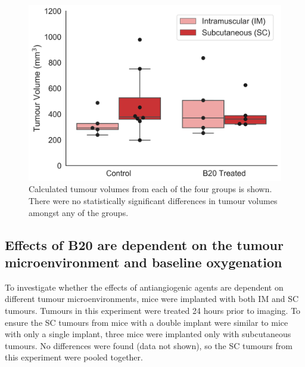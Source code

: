 \begin{figure}[htbp]
   \centering
   \includegraphics[width=\textwidth]{oemri_thesis3/oemri_thesis3-images/6_oep8_tumourVolumes.png} %
   \caption{Calculated tumour volumes from each of the four groups is shown. There were no statistically significant differences in tumour volumes amongst any of the groups.}
   \label{tumourVolumes}
\end{figure}


\subsection{Effects of B20 are dependent on the tumour microenvironment and baseline oxygenation}

To investigate whether the effects of antiangiogenic agents are dependent on different tumour microenvironments, mice were implanted with both \acs{IM} and \acs{SC} tumours. 
Tumours in this experiment were treated 24 hours prior to imaging.
To ensure the \acs{SC} tumours from mice with a double implant were similar to mice with only a single implant, three mice were implanted only with subcutaneous tumours.
No differences were found (data not shown), so the \acs{SC} tumours from this experiment were pooled together.

